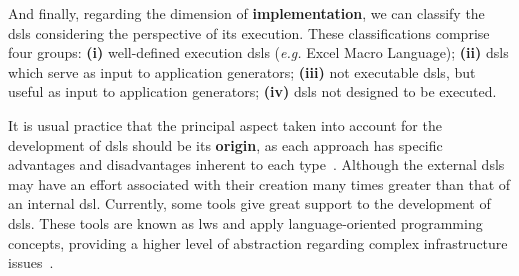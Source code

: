 And finally, regarding the dimension of \textbf{implementation}, we can classify the \acp{dsl} considering the perspective of its execution.
These classifications comprise four groups:
\textbf{(i)} well-defined execution \acp{dsl} (\textit{e.g.} Excel Macro Language);
\textbf{(ii)} \acp{dsl} which serve as input to application generators;
\textbf{(iii)} not executable \acp{dsl}, but useful as input to application generators;
\textbf{(iv)} \acp{dsl} not designed to be executed.



It is usual practice that the principal aspect taken into account for the development of \acp{dsl} should be its \textbf{origin}, as each approach has specific advantages and disadvantages inherent to each type~\cite{Fowler:2010}.
Although the external \acp{dsl} may have an effort associated with their creation many times greater than that of an internal \ac{dsl}. 
Currently, some tools give great support to the development of \acp{dsl}.
These tools are known as \acp{lw} and apply language-oriented programming concepts, providing a higher level of abstraction regarding complex infrastructure issues~\cite{Fowler:2005}.


